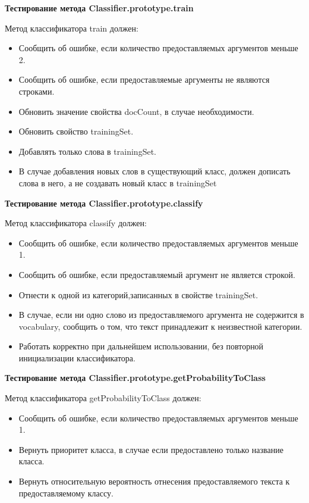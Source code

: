 \documentclass[14pt,a4paper]{extreport}
\begin{document}
    \hspace{18pt} \textbf{Тестирование метода Classifier.prototype.train}
    \\ \par Метод классификатора train должен:
    \begin{itemize}
      \item Сообщить об ошибке, если количество предоставляемых аргументов меньше 2.
      \item Сообщить об ошибке, если предоставляемые аргументы не являются строками.
      \item Обновить значение свойства docCount, в случае необходимости.
      \item Обновить свойство trainingSet.
      \item Добавлять только слова в trainingSet.
      \item В случае добавления новых слов в существующий класс, должен дописать слова в него, а не создавать новый класс в trainingSet
    \end{itemize}

    \hspace{18pt} \textbf{Тестирование метода Classifier.prototype.classify}
    \\ \par Метод классификатора classify должен:
    \begin{itemize}
      \item Сообщить об ошибке, если количество предоставляемых аргументов меньше 1.
      \item Сообщить об ошибке, если предоставляемый аргумент не является строкой.
      \item Отнести к одной из категорий,записанных в свойстве trainingSet.
      \item В случае, если ни одно слово из предоставляемого аргумента не содержится в vocabulary, сообщить о том, что текст принадлежит к неизвестной категории.
      \item Работать корректно при дальнейшем использовании, без повторной инициализации классификатора.
    \end{itemize}

    \hspace{18pt} \textbf{Тестирование метода Classifier.prototype.getProbabilityToClass}
    \\ \par Метод классификатора getProbabilityToClass должен:
    \begin{itemize}
      \item Сообщить об ошибке, если количество предоставляемых аргументов меньше 1.
      \item Вернуть приоритет класса, в случае если предоставлено только название класса.
      \item Вернуть относительную вероятность отнесения предоставляемого текста к предоставляемому классу.
    \end{itemize}
    \newpage
\end{document}
